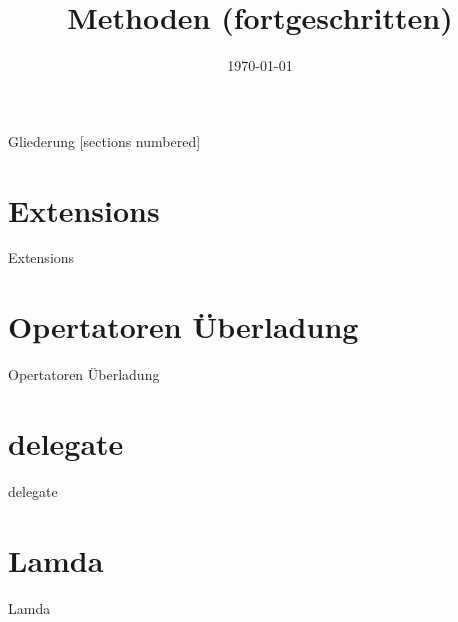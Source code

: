 



\title{Methoden (fortgeschritten)}
\date{\today}




\maketitle

\begin{frame}{Gliederung}
	[sections numbered]
	\tableofcontents
\end{frame}

\section{Extensions}
\begin{frame}{Extensions}

\end{frame}

\section{Opertatoren Überladung}
\begin{frame}{Opertatoren Überladung}

\end{frame}

\section{delegate}
\begin{frame}{delegate}

\end{frame}

\section{Lamda}
\begin{frame}{Lamda}

\end{frame}

